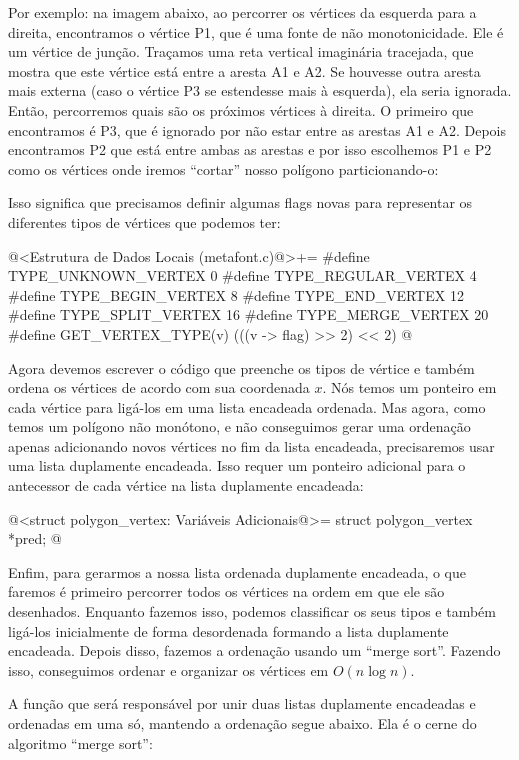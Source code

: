 {{{{{{Por exemplo: na imagem abaixo, ao percorrer os vértices da esquerda
para a direita, encontramos o vértice P1, que é uma fonte de não
monotonicidade. Ele é um vértice de junção. Traçamos uma reta vertical
imaginária tracejada, que mostra que este vértice está entre a aresta
A1 e A2. Se houvesse outra aresta mais externa (caso o vértice P3 se
estendesse mais à esquerda), ela seria ignorada. Então, percorremos
quais são os próximos vértices à direita. O primeiro que encontramos é
P3, que é ignorado por não estar entre as arestas A1 e A2. Depois
encontramos P2 que está entre ambas as arestas e por isso escolhemos
P1 e P2 como os vértices onde iremos ``cortar'' nosso polígono
particionando-o:


Isso significa que precisamos definir algumas flags novas para
representar os diferentes tipos de vértices que podemos ter:

\iniciocodigo
@<Estrutura de Dados Locais (metafont.c)@>+=
#define TYPE_UNKNOWN_VERTEX  0
#define TYPE_REGULAR_VERTEX  4
#define TYPE_BEGIN_VERTEX    8
#define TYPE_END_VERTEX     12
#define TYPE_SPLIT_VERTEX   16
#define TYPE_MERGE_VERTEX   20
#define GET_VERTEX_TYPE(v) (((v -> flag) >> 2) << 2)
@
\fimcodigo

Agora devemos escrever o código que preenche os tipos de vértice e
também ordena os vértices de acordo com sua coordenada $x$. Nós temos
um ponteiro em cada vértice para ligá-los em uma lista encadeada
ordenada. Mas agora, como temos um polígono não monótono, e não
conseguimos gerar uma ordenação apenas adicionando novos vértices no
fim da lista encadeada, precisaremos usar uma lista duplamente
encadeada. Isso requer um ponteiro adicional para o antecessor de cada
vértice na lista duplamente encadeada:

\iniciocodigo
@<struct polygon\_vertex: Variáveis Adicionais@>=
  struct polygon_vertex *pred;
@
\fimcodigo

Enfim, para gerarmos a nossa lista ordenada duplamente encadeada, o
que faremos é primeiro percorrer todos os vértices na ordem em que ele
são desenhados. Enquanto fazemos isso, podemos classificar os seus
tipos e também ligá-los inicialmente de forma desordenada formando a
lista duplamente encadeada. Depois disso, fazemos a ordenação usando
um ``merge sort''. Fazendo isso, conseguimos ordenar e organizar os
vértices em $O(n \log n)$.

A função que será responsável por unir duas listas duplamente
encadeadas e ordenadas em uma só, mantendo a ordenação segue
abaixo. Ela é o cerne do algoritmo ``merge sort'':

}}}}}}
